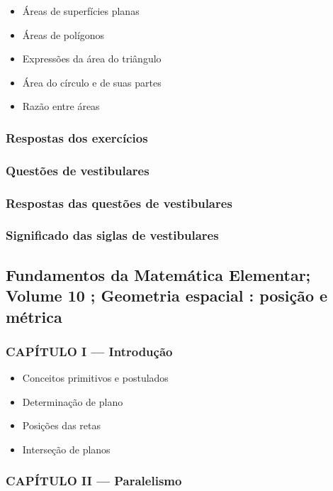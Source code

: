 \documentclass[a4paper,12pt]{article}[abntex2]
\begin{document}
\begin{itemize}
\item Áreas de superfícies planas
\item Áreas de polígonos
\item Expressões da área do triângulo
\item Área do círculo e de suas partes
\item Razão entre áreas
\end{itemize}
\subsubsection*{Respostas dos exercícios}

\subsubsection*{Questões de vestibulares}

\subsubsection*{Respostas das questões de vestibulares}

\subsubsection*{Significado das siglas de vestibulares}

 \subsection{Fundamentos da Matemática Elementar; Volume 10 ; Geometria espacial : posição e métrica}

\subsubsection*{CAPÍTULO I — Introdução}

\begin{itemize}
\item Conceitos primitivos e postulados
\item Determinação de plano
\item Posições das retas
\item Interseção de planos
\end{itemize}
\subsubsection*{CAPÍTULO II — Paralelismo}
\end{document}
